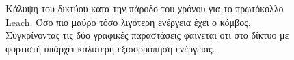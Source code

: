 \begin{figure}[H]
  \centering
  \caption{Κάλυψη του δικτύου κατα την πάροδο του χρόνου για το πρωτόκολλο Leach. Όσο πιο μαύρο τόσο λιγότερη ενέργεια έχει ο κόμβος. Συγκρίνοντας τις δύο γραφικές
παραστάσεις φαίνεται οτι στο δίκτυο με φορτιστή υπάρχει καλύτερη εξισορρόπηση ενέργειας.}
  \label{fig:5_1exp_4_2}
\end{figure}

